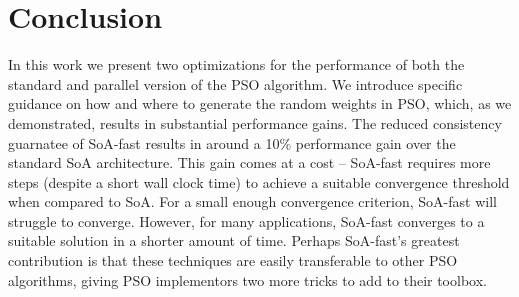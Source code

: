 \section{Conclusion}
In this work we present two optimizations for the performance of both the
standard and parallel version of the PSO algorithm. We introduce
specific guidance on how and where to generate the random weights in
PSO, which, as we demonstrated, results in substantial performance gains. 
The reduced consistency guarnatee of SoA-fast results in around a 10\% performance
gain over the standard SoA architecture. This gain comes at a cost -- SoA-fast
requires more steps (despite a short wall clock time) to achieve a suitable
convergence threshold when compared to SoA. For a small enough convergence
criterion, SoA-fast will struggle to converge. However, for many applications,
SoA-fast converges to a suitable solution in a shorter amount of time. Perhaps
SoA-fast's greatest contribution is that these techniques are easily transferable
to other PSO algorithms, giving PSO implementors two more tricks to add to their
toolbox.


